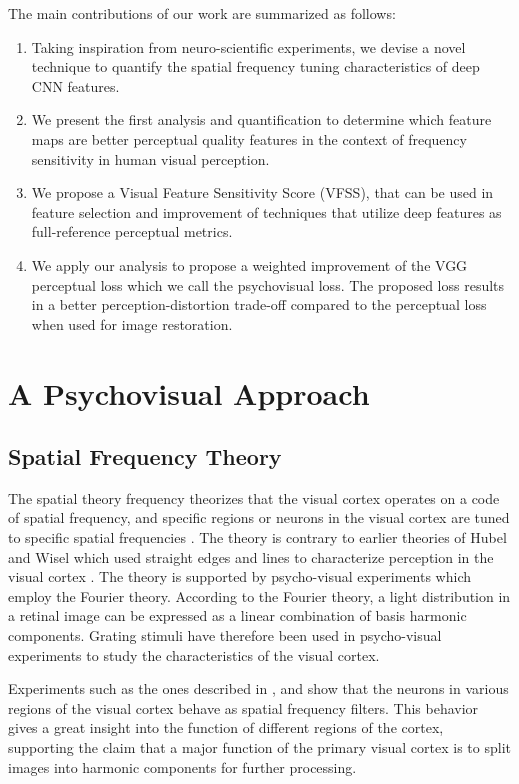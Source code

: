 \documentclass[10pt,twocolumn,letterpaper]{article}
\begin{document}
The main contributions of our work are summarized as follows:
\begin{enumerate}
\item Taking inspiration from neuro-scientific experiments, we devise a novel technique to quantify the spatial frequency tuning characteristics of deep CNN features.
\item We present the first analysis and quantification to determine which feature maps are better perceptual quality features in the context of frequency sensitivity in human visual perception. 
\item We propose a Visual Feature Sensitivity Score (VFSS), that can be used in feature selection and improvement of techniques that utilize deep features as full-reference perceptual metrics.
\item We apply our analysis to propose a weighted improvement of the VGG perceptual loss which we call the psychovisual loss. The proposed loss results in a better perception-distortion trade-off compared to the perceptual loss when used for image restoration. 
\end{enumerate}
\section{A Psychovisual Approach}

\subsection{Spatial Frequency Theory}
The spatial theory frequency theorizes that the visual cortex operates on a code of spatial frequency, and specific regions or neurons in the visual cortex are tuned to specific spatial frequencies \cite{14}. The theory is contrary to earlier theories of Hubel and Wisel which used straight edges and lines to characterize perception in the visual cortex \cite{18}. The theory is supported by psycho-visual experiments which employ the Fourier theory. According to the Fourier theory, a light distribution in a retinal image can be expressed as a linear combination of basis harmonic components. Grating stimuli have therefore been used in psycho-visual experiments to study the characteristics of the visual cortex. 

   Experiments such as the ones described in \cite{14}, \cite{17} and \cite{19} show that the neurons in various regions of the visual cortex behave as spatial frequency filters. This behavior gives a great insight into the function of different regions of the cortex, supporting the claim that a major function of the primary visual cortex is to split images into harmonic components for further processing. 
\end{document}

